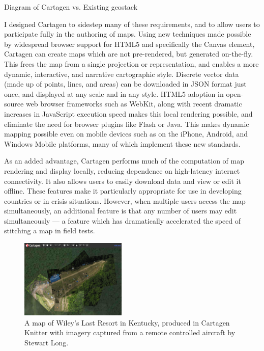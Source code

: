 \documentclass[11pt,oneside,notitlepage]{report}
\begin{document}
Diagram of Cartagen vs. Existing geostack

I designed Cartagen to sidestep many of these requirements, and to allow users to participate fully in the authoring of maps. Using new techniques made possible by widespread browser support for HTML5 and specifically the Canvas element, Cartagen can create maps which are not pre-rendered, but generated on-the-fly. This frees the map from a single projection or representation, and enables a more dynamic, interactive, and narrative cartographic style. Discrete vector data (made up of points, lines, and areas) can be downloaded in JSON format just once, and displayed at any scale and in any style. HTML5 adoption in open-source web browser frameworks such as WebKit, along with recent dramatic increases in JavaScript execution speed makes this local rendering possible, and eliminate the need for browser plugins like Flash or Java. This makes dynamic mapping possible even on mobile devices such as on the iPhone, Android, and Windows Mobile platforms, many of which implement these new standards. 

As an added advantage, Cartagen performs much of the computation of map rendering and display locally, reducing dependence on high-latency internet connectivity. It also allows users to easily download data and view or edit it offline. These features make it particularly appropriate for use in developing countries or in crisis situations. However, when multiple users access the map simultaneously, an additional feature is that any number of users may edit simultaneously --- a feature which has dramatically accelerated the speed of stitching a map in field tests. 

\begin{figure}
	\begin{flushright}
		\includegraphics[width=0.45\textwidth]{images/knitter-wileys.png}
		\caption{A map of Wiley's Last Resort in Kentucky, produced in Cartagen Knitter with imagery captured from a remote controlled aircraft by Stewart Long.}
	\end{flushright}
\end{figure}
\end{document}
